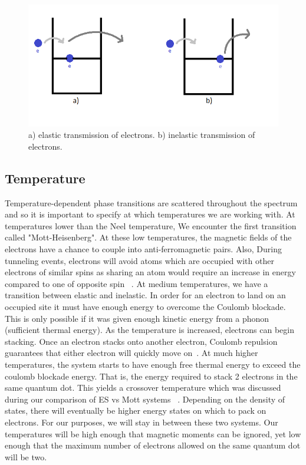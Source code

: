 \begin{figure}[htbp]
\begin{center}
\includegraphics[scale=.50]{inelasticvselastic.png}
\caption{a) elastic transmission of electrons. b) inelastic transmission of electrons.}
\label{inelasticvselastic}
\end{center}
\end{figure}

\subsection{Temperature}

Temperature-dependent phase transitions are scattered throughout the spectrum and so it is important to specify at which temperatures we are working with. At temperatures lower than the Neel temperature, We encounter the first transition called "Mott-Heisenberg". At these low temperatures, the magnetic fields of the electrons have a chance to couple into anti-ferromagnetic pairs. Also, During tunneling events, electrons will avoid atoms which are occupied with other electrons of similar spins as sharing an atom would require an increase in energy compared to one of opposite spin ~\cite{Gebhard03}. At medium temperatures, we have a transition between elastic and inelastic. In order for an electron to land on an occupied site it must have enough energy to overcome the Coulomb blockade. This is only possible if it was given enough kinetic energy from a phonon (sufficient thermal energy). As the temperature is increased, electrons can begin stacking. Once an electron stacks onto another electron, Coulomb repulsion guarantees that either electron will quickly move on~\cite{Glazman05}. At much higher temperatures, the system starts to have enough free thermal energy to exceed the coulomb blockade energy. That is, the energy required to stack 2 electrons in the same quantum dot. This yields a crossover temperature which was discussed during our comparison of ES vs Mott systems ~\cite{aharony92}. Depending on the density of states, there will eventually be higher energy states on which to pack on electrons. For our purposes, we will stay in between these two systems. Our temperatures will be high enough that magnetic moments can be ignored, yet low enough that the maximum number of electrons allowed on the same quantum dot will be two.

